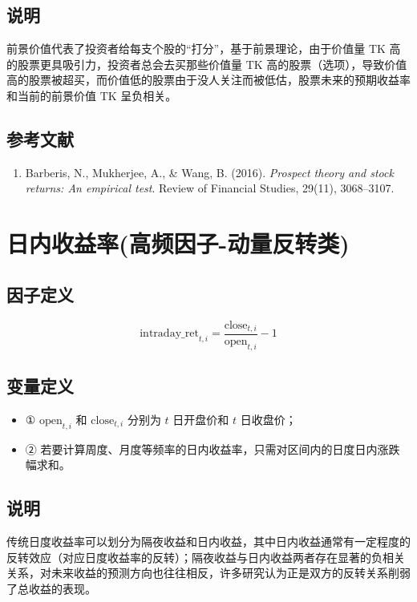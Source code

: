 \documentclass{article}
\begin{document}
\subsection{说明}
前景价值代表了投资者给每支个股的“打分”，基于前景理论，由于价值量 \( \mathrm{TK} \) 高的股票更具吸引力，投资者总会去买那些价值量 \( \mathrm{TK} \) 高的股票（选项），导致价值高的股票被超买，而价值低的股票由于没人关注而被低估，股票未来的预期收益率和当前的前景价值 \( \mathrm{TK} \) 呈负相关。

\subsection{参考文献}
\begin{enumerate}
    \item Barberis, N., Mukherjee, A., \& Wang, B. (2016). \textit{Prospect theory and stock returns: An empirical test}. Review of Financial Studies, 29(11), 3068–3107.
\end{enumerate}

\section{日内收益率(高频因子-动量反转类)}

\subsection{因子定义}
\begin{equation}
    \mathrm{intraday\_ret}_{t,i} = \frac{\mathrm{close}_{t,i}}{\mathrm{open}_{t,i}} - 1
\end{equation}

\subsection{变量定义}
\begin{itemize}
    \item ① \( \mathrm{open}_{t,i} \) 和 \( \mathrm{close}_{t,i} \) 分别为 \( t \) 日开盘价和 \( t \) 日收盘价；
    \item ② 若要计算周度、月度等频率的日内收益率，只需对区间内的日度日内涨跌幅求和。
\end{itemize}

\subsection{说明}
传统日度收益率可以划分为隔夜收益和日内收益，其中日内收益通常有一定程度的反转效应（对应日度收益率的反转）；隔夜收益与日内收益两者存在显著的负相关关系，对未来收益的预测方向也往往相反，许多研究认为正是双方的反转关系削弱了总收益的表现。
\end{document}
